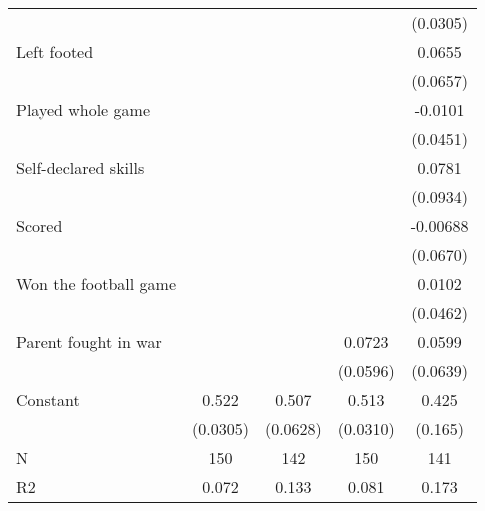 {\begin{tabular}{l*{4}{c}}
                    &                     &                     &                     &    (0.0305)         \\
[1em]
Left footed         &                     &                     &                     &      0.0655         \\
                    &                     &                     &                     &    (0.0657)         \\
[1em]
Played whole game   &                     &                     &                     &     -0.0101         \\
                    &                     &                     &                     &    (0.0451)         \\
[1em]
Self-declared skills&                     &                     &                     &      0.0781         \\
                    &                     &                     &                     &    (0.0934)         \\
[1em]
Scored              &                     &                     &                     &    -0.00688         \\
                    &                     &                     &                     &    (0.0670)         \\
[1em]
Won the football game&                     &                     &                     &      0.0102         \\
                    &                     &                     &                     &    (0.0462)         \\
[1em]
Parent fought in war&                     &                     &      0.0723         &      0.0599         \\
                    &                     &                     &    (0.0596)         &    (0.0639)         \\
[1em]
Constant            &       0.522\sym{***}&       0.507\sym{***}&       0.513\sym{***}&       0.425\sym{**} \\
                    &    (0.0305)         &    (0.0628)         &    (0.0310)         &     (0.165)         \\
\hline
N                   &         150         &         142         &         150         &         141         \\
R2                  &       0.072         &       0.133         &       0.081         &       0.173         \\
\hline\hline
\end{tabular}
}
